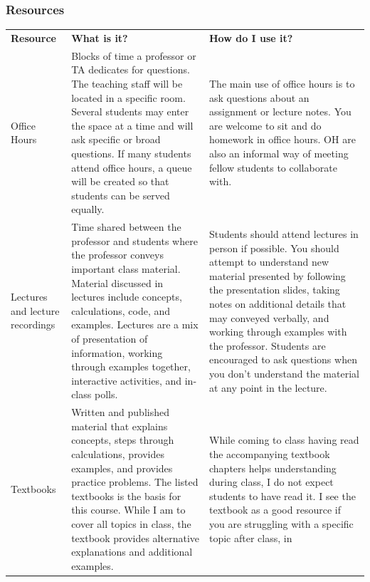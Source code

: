 \documentclass[
  letterpaper,
  DIV=11,
  numbers=noendperiod]{scrartcl}
\begin{document}
\hypertarget{resources}{%
\subsubsection{Resources}\label{resources}}

\begin{longtable}[]{@{}
  >{\centering\arraybackslash}p{}
  >{\raggedright\arraybackslash}p{}
  >{\raggedright\arraybackslash}p{}@{}}
\toprule\noalign{}
\endhead
\bottomrule\noalign{}
\endlastfoot
\textbf{Resource} & \textbf{What is it?} & \textbf{How do I use it?} \\
Office Hours & Blocks of time a professor or TA dedicates for questions.
The teaching staff will be located in a specific room. Several students
may enter the space at a time and will ask specific or broad questions.
If many students attend office hours, a queue will be created so that
students can be served equally. & The main use of office hours is to ask
questions about an assignment or lecture notes. You are welcome to sit
and do homework in office hours. OH are also an informal way of meeting
fellow students to collaborate with. \\
Lectures and lecture recordings & Time shared between the professor and
students where the professor conveys important class material. Material
discussed in lectures include concepts, calculations, code, and
examples. Lectures are a mix of presentation of information, working
through examples together, interactive activities, and in-class polls. &
Students should attend lectures in person if possible. You should
attempt to understand new material presented by following the
presentation slides, taking notes on additional details that may
conveyed verbally, and working through examples with the professor.
Students are encouraged to ask questions when you don't understand the
material at any point in the lecture. \\
Textbooks & Written and published material that explains concepts, steps
through calculations, provides examples, and provides practice problems.
The listed textbooks is the basis for this course. While I am to cover
all topics in class, the textbook provides alternative explanations and
additional examples. & While coming to class having read the
accompanying textbook chapters helps understanding during class, I do
not expect students to have read it. I see the textbook as a good
resource if you are struggling with a specific topic after class, in

\end{longtable}
\end{document}
